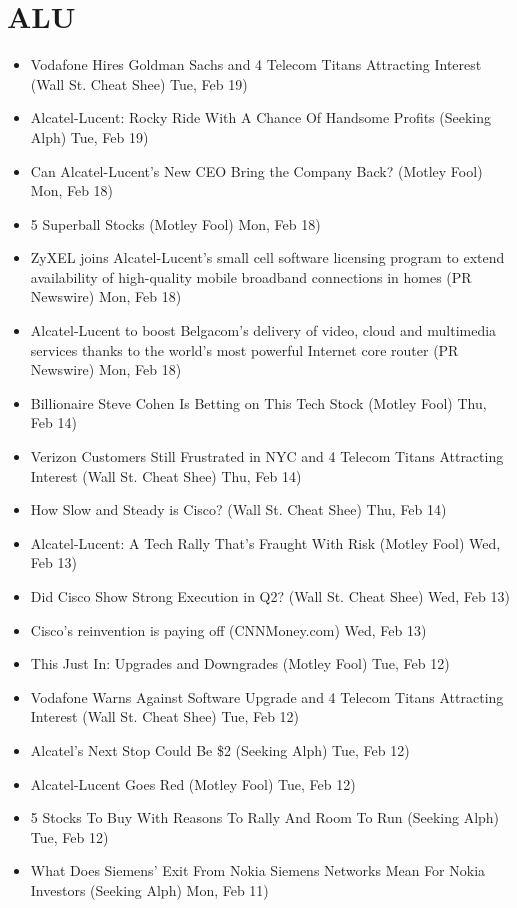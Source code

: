 \documentclass[11pt,asymmetric]{article}
\begin{document}
\section*{ALU}
\begin{itemize}
\item Vodafone Hires Goldman Sachs and 4 Telecom Titans Attracting Interest (Wall St. Cheat Shee) Tue, Feb 19)
\item Alcatel-Lucent: Rocky Ride With A Chance Of Handsome Profits (Seeking Alph) Tue, Feb 19)
\item Can Alcatel-Lucent's New CEO Bring the Company Back? (Motley Fool) Mon, Feb 18)
\item 5 Superball Stocks (Motley Fool) Mon, Feb 18)
\item ZyXEL joins Alcatel-Lucent's small cell software licensing program to extend availability of high-quality mobile broadband connections in homes (PR Newswire) Mon, Feb 18)
\item Alcatel-Lucent to boost Belgacom's delivery of video, cloud and multimedia services thanks to the world's most powerful Internet core router (PR Newswire) Mon, Feb 18)
\item Billionaire Steve Cohen Is Betting on This Tech Stock (Motley Fool) Thu, Feb 14)
\item Verizon Customers Still Frustrated in NYC and 4 Telecom Titans Attracting Interest (Wall St. Cheat Shee) Thu, Feb 14)
\item How Slow and Steady is Cisco? (Wall St. Cheat Shee) Thu, Feb 14)
\item Alcatel-Lucent: A Tech Rally That's Fraught With Risk (Motley Fool) Wed, Feb 13)
\item Did Cisco Show Strong Execution in Q2? (Wall St. Cheat Shee) Wed, Feb 13)
\item Cisco's reinvention is paying off (CNNMoney.com) Wed, Feb 13)
\item This Just In: Upgrades and Downgrades (Motley Fool) Tue, Feb 12)
\item Vodafone Warns Against Software Upgrade and 4 Telecom Titans Attracting Interest (Wall St. Cheat Shee) Tue, Feb 12)
\item Alcatel's Next Stop Could Be \$2 (Seeking Alph) Tue, Feb 12)
\item Alcatel-Lucent Goes Red (Motley Fool) Tue, Feb 12)
\item 5 Stocks To Buy With Reasons To Rally And Room To Run (Seeking Alph) Tue, Feb 12)
\item What Does Siemens' Exit From Nokia Siemens Networks Mean For Nokia Investors (Seeking Alph) Mon, Feb 11)

\end{itemize}
\end{document}
